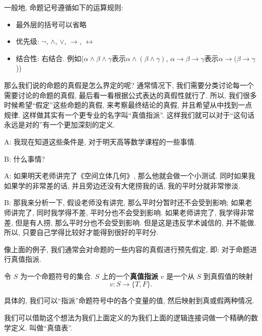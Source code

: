      \begin{definition}[命题符号的运算规则]
        一般地, 命题记号遵循如下的运算规则: 
        \begin{itemize}
            \setlength{\itemsep}{6pt}
            \item 最外层的括号可以省略
            \item 优先级: $\lnot$, $\land$, $\lor$, $\to$, $\leftrightarrow$
            \item 结合性: 右结合. 例如($\alpha \land \beta \land \gamma$表示$\alpha \land (\beta \land \gamma)$,
              $\alpha \to \beta \to \gamma$表示$\alpha \to (\beta \to \gamma$))
          \end{itemize}
      \end{definition}

那么我们说的命题的真假是怎么界定的呢? 通常情况下, 我们需要分类讨论每一个需要讨论的命题的真假, 最后看一看根据公式表达的真假性就行了. 所以, 我们很多时候希望``假定''这些命题的真假, 来考察最终结论的真假, 并且希望从中找到一点规律. 这样做其实有一个更专业的名字叫``真值指派''. 这样我们就可以对于``这句话永远是对的''有一个更加深刻的定义. 

\begin{dialogue}
	A: 我现在知道这些条件是, 对于明天高等数学课程的一些事情. 
	
	B: 什么事情? 
	
	A: 如果明天老师讲完了《空间立体几何》, 那么他就会做一个小测试. 同时如果我如果学的非常差的话, 并且旁边还没有大佬捞我的话, 我的平时分就非常惨淡. 
	
	B: 那我来分析一下, 假设老师没有讲完, 那么平时分暂时还不会受到影响; 如果老师讲完了, 同时我学得不差, 平时分也不会受到影响. 如果老师讲完了, 我学得非常差, 但是有人捞, 那么平时分也不会受到影响. 但是这是违反学术诚信的, 并不能做. 所以, 只要自己学得比较好才能得到很好的平时分. 
\end{dialogue}

像上面的例子, 我们通常会对命题的一些内容的真假进行预先假定, 即: 对于命题进行真值指派. 

	\begin{definition}[真值指派 ($v$)]
        令 $S$ 为一个命题符号的集合. 
        $S$ 上的一个{\bf 真值指派} $v$ 是一个从 $S$ 到真假值的映射
        \[
          v: S \to \{T, F\}.
        \]
    \end{definition}

具体的, 我们可以``指派''命题符号中的各个变量的值, 然后映射到真或假两种情况. 

我们可以借助这个想法为我们上面定义的为我们上面的逻辑连接词做一个精确的数学定义. 叫做``真值表''. 

